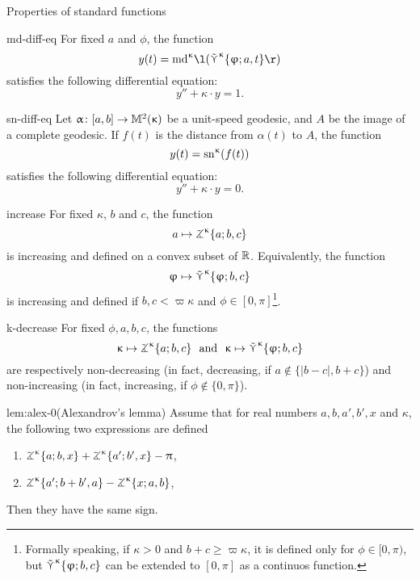 \begin{thm}{Properties of standard functions}

\begin{subthm}{md-diff-eq}
For fixed $a$ and $\phi$, the function 
\[y(t)=\md\kappa\l(\side\kappa\{\phi;a,t\}\r)\]
 satisfies the following differential equation:
\[y''+\kappa\cdot y=1.\]
\end{subthm}

\begin{subthm}{sn-diff-eq}
Let $\alpha\:[a,b]\to\Lob2\kappa$ be a unit-speed geodesic, and $A$ be the image of a complete geodesic.  If $f(t)$ is the distance from $\alpha(t)$ to $A$, the function 
\[y(t)=\mathrm{sn}^{\upkappa} (f(t))\]
 satisfies the following differential equation:
\[y''+\kappa\cdot y=0.\]
\end{subthm}

\begin{subthm}{increase}
For fixed $\kappa$, $b$ and $c$, the function 
\[a\mapsto\tangle\mc\kappa\{a;b,c\}\]
is increasing and defined on a convex subset of $\mathbb{R}$.
Equivalently, the function
\[\phi\mapsto\side\kappa \{\phi;b,c\}\]
is increasing and defined if $b,c<\varpi\kappa$ and $\phi\in[0,\pi]$\footnote{Formally speaking, if $\kappa>0$ and $b+c\ge \varpi\kappa$, it is defined only for $\phi\in[0,\pi)$, but $\mathop{\tilde\curlyvee}\nolimits^{\upkappa} \{\upvarphi;b,c\}$ can be extended to $[0,\pi]$ as a continuos function.}.
\end{subthm}

\begin{subthm}{k-decrease}
For fixed $\phi,a,b,c$, the functions
\[\kappa\mapsto \tangle\mc\kappa\{a;b,c\}\ \ \text{and}\ \ \kappa\mapsto \side\kappa \{\phi;b,c\}\]
are respectively non-decreasing (in fact, decreasing, if $a\notin\{|b-c|, b+c\}$) and non-increasing (in fact, increasing, if $\phi\notin\{0,\pi\}$).
\end{subthm}

\begin{subthm}{lem:alex-0}(Alexandrov's lemma)
Assume that for real numbers $a,b,a',b', x$ and $\kappa$, the following two expressions are defined
\begin{enumerate}
\item $\tangle\mc\kappa\{a;b,x\}+\tangle\mc\kappa\{a';b',x\}-\pi$,
\item $\tangle\mc\kappa\{a';b+b',a\}-\tangle\mc\kappa\{x;a,b\}$,
\end{enumerate}
Then they have the same sign.
\end{subthm}
\end{thm}


